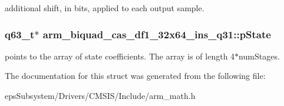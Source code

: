 additional shift, in bits, applied to each output sample. \hypertarget{structarm__biquad__cas__df1__32x64__ins__q31_a4c899cdfaf2bb955323e93637bd662e0}{
\subsubsection[{p\-State}]{\setlength{\rightskip}{0pt plus 5cm}q63\-\_\-t$\ast$ arm\-\_\-biquad\-\_\-cas\-\_\-df1\-\_\-32x64\-\_\-ins\-\_\-q31\-::p\-State}}\label{structarm__biquad__cas__df1__32x64__ins__q31_a4c899cdfaf2bb955323e93637bd662e0}
points to the array of state coefficients. The array is of length 4$\ast$num\-Stages. 

The documentation for this struct was generated from the following file\-:\begin{DoxyCompactItemize}
\item 
eps\-Subsystem/\-Drivers/\-C\-M\-S\-I\-S/\-Include/arm\-\_\-math.\-h\end{DoxyCompactItemize}
